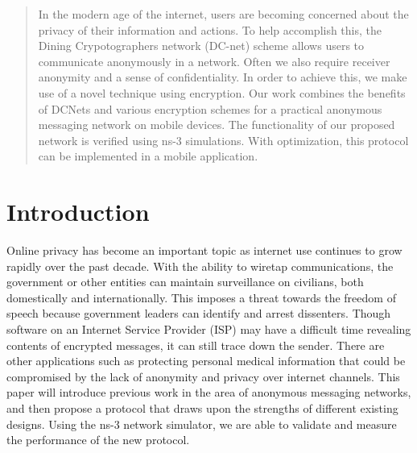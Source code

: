 \documentclass{acm_proc_article-sp}
\begin{document}

\maketitle
\begin{abstract}
\vspace{1 mm}
In the modern age of the internet, users are becoming concerned about the privacy of their information and actions. To help accomplish this, the Dining Crypotographers network (DC-net) scheme allows users to communicate anonymously in a network. Often we also require receiver anonymity and a sense of confidentiality. In order to achieve this, we make use of a novel technique using encryption. Our work combines the benefits of DCNets and various encryption schemes for a practical anonymous messaging network on mobile devices. The functionality of our proposed network is verified using ns-3 simulations. With optimization, this protocol can be implemented in a mobile application.

\end{abstract}



\section{Introduction}
\vspace{1 mm}
Online privacy has become an important topic as internet use continues to grow rapidly over the past decade. With the ability to wiretap communications, the government or other entities can maintain surveillance on civilians, both domestically and internationally. This imposes a threat towards the freedom of speech because government leaders can identify and arrest dissenters. Though software on an Internet Service Provider (ISP) may have a difficult time revealing contents of encrypted messages, it can still trace down the sender. There are other applications such as protecting personal medical information that could be compromised by the lack of anonymity and privacy over internet channels. This paper will introduce previous work in the area of anonymous messaging networks, and then propose a protocol that draws upon the strengths of different existing designs. Using the ns-3 network simulator, we are able to validate and measure the performance of the new protocol.
 
\end{document}
